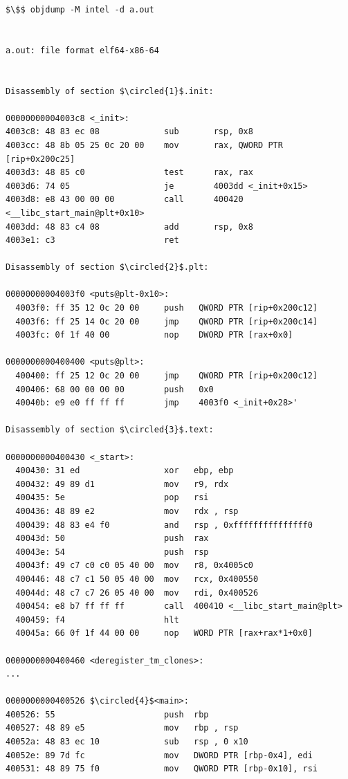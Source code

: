 \documentclass[]{project_plan}
\newcommand*\circled[1]{\tikz[baseline=(char.base)]{
            \node[shape=circle,draw,inner sep=2pt] (char) {#1};}}
\begin{document}
\begin{lstlisting}[mathescape]
  $\$$ objdump -M intel -d a.out


a.out: file format elf64-x86-64


Disassembly of section $\circled{1}$.init:

00000000004003c8 <_init>:
4003c8: 48 83 ec 08             sub       rsp, 0x8
4003cc: 48 8b 05 25 0c 20 00    mov       rax, QWORD PTR [rip+0x200c25]
4003d3: 48 85 c0                test      rax, rax
4003d6: 74 05                   je        4003dd <_init+0x15>
4003d8: e8 43 00 00 00          call      400420 <__libc_start_main@plt+0x10>
4003dd: 48 83 c4 08             add       rsp, 0x8
4003e1: c3                      ret

Disassembly of section $\circled{2}$.plt:

00000000004003f0 <puts@plt-0x10>:
  4003f0: ff 35 12 0c 20 00     push   QWORD PTR [rip+0x200c12]
  4003f6: ff 25 14 0c 20 00     jmp    QWORD PTR [rip+0x200c14]
  4003fc: 0f 1f 40 00           nop    DWORD PTR [rax+0x0]

0000000000400400 <puts@plt>:
  400400: ff 25 12 0c 20 00     jmp    QWORD PTR [rip+0x200c12]
  400406: 68 00 00 00 00        push   0x0
  40040b: e9 e0 ff ff ff        jmp    4003f0 <_init+0x28>'

Disassembly of section $\circled{3}$.text:

0000000000400430 <_start>:
  400430: 31 ed                 xor   ebp, ebp
  400432: 49 89 d1              mov   r9, rdx
  400435: 5e                    pop   rsi
  400436: 48 89 e2              mov   rdx , rsp
  400439: 48 83 e4 f0           and   rsp , 0xfffffffffffffff0
  40043d: 50                    push  rax
  40043e: 54                    push  rsp
  40043f: 49 c7 c0 c0 05 40 00  mov   r8, 0x4005c0
  400446: 48 c7 c1 50 05 40 00  mov   rcx, 0x400550
  40044d: 48 c7 c7 26 05 40 00  mov   rdi, 0x400526
  400454: e8 b7 ff ff ff        call  400410 <__libc_start_main@plt>
  400459: f4                    hlt
  40045a: 66 0f 1f 44 00 00     nop   WORD PTR [rax+rax*1+0x0]

0000000000400460 <deregister_tm_clones>:
...

0000000000400526 $\circled{4}$<main>:
400526: 55                      push  rbp
400527: 48 89 e5                mov   rbp , rsp
40052a: 48 83 ec 10             sub   rsp , 0 x10
40052e: 89 7d fc                mov   DWORD PTR [rbp-0x4], edi
400531: 48 89 75 f0             mov   QWORD PTR [rbp-0x10], rsi

\end{lstlisting}
\end{document}
